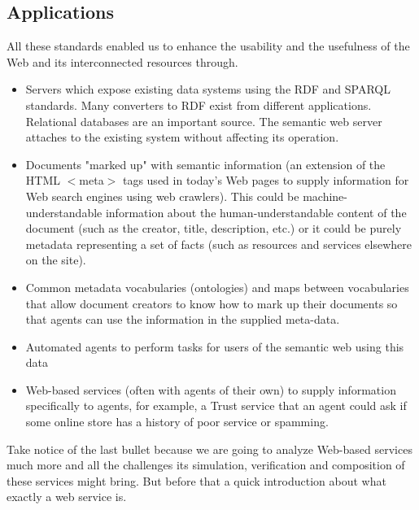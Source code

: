\subsection*{Applications}
All these standards enabled us to enhance the usability and the usefulness of the Web and its interconnected resources through.

\begin{itemize}
    \item Servers which expose existing data systems using the RDF and SPARQL standards. Many converters to RDF exist from different applications. Relational databases are an important source. The semantic web server attaches to the existing system without affecting its operation.
    \item Documents "marked up" with semantic information (an extension of the HTML $<$meta$>$ tags used in today's Web pages to supply information for Web search engines using web crawlers). This could be machine-understandable information about the human-understandable content of the document (such as the creator, title, description, etc.) or it could be purely metadata representing a set of facts (such as resources and services elsewhere on the site).
    \item Common metadata vocabularies (ontologies) and maps between vocabularies that allow document creators to know how to mark up their documents so that agents can use the information in the supplied meta-data.
    \item Automated agents to perform tasks for users of the semantic web using this data
    \item Web-based services (often with agents of their own) to supply information specifically to agents, for example, a Trust service that an agent could ask if some online store has a history of poor service or spamming.
\end{itemize}

Take notice of the last bullet because we are going to analyze Web-based services much more and all the challenges its simulation, verification and composition of these services might bring. But before that a quick introduction about what exactly a web service is.